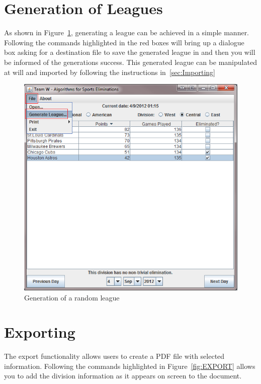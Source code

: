\section{Generation of Leagues}
As shown in Figure~\ref{fig:GENPIC}, generating a league can be
achieved in a simple manner. Following the commands highlighted in the
red boxes will bring up a dialogue box asking for a destination file
to save the generated league in and then you will be informed of the
generations success. This generated league can be manipulated at will
and imported by following the instructions in~\ref{sec:Importing}
\begin{figure}
  \includegraphics[width=\linewidth,keepaspectratio]{images/userManualDesk7.png}
  \caption{Generation of a random league}\label{fig:GENPIC}
\end{figure}

\section{Exporting}

The export functionality allows users to create a PDF file with
selected information. Following the commands highlighted in
Figure~\ref{fig:EXPORT} allows you to add the division information as
it appears on screen to the document.

